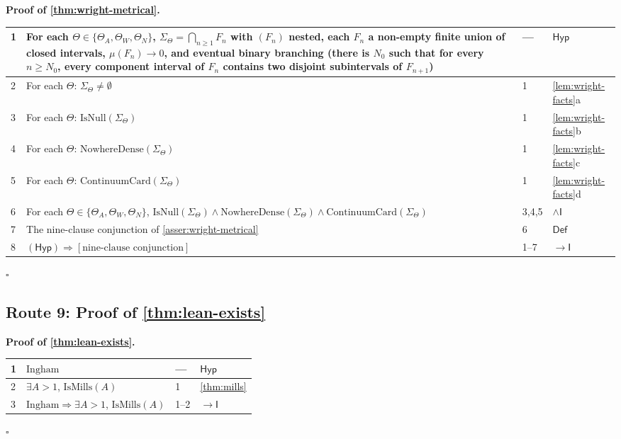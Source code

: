 \documentclass[11pt,reqno]{amsart}
\theoremstyle{blueplain}
\renewcommand{\qedsymbol}{\textcolor{proofqed}{\ensuremath{\square}}}
\renewenvironment{proof}[1][Proof]{\par\noindent\textbf{\textcolor{proofhead}{#1.}}\par\nobreak}{\par\nobreak\hfill\qedsymbol}
\newcounter{asser}
\numberwithin{equation}{section}
\begin{document}
\begin{proof}[\textbf{Proof of \cref{thm:wright-metrical}}]
	\label{proof:wright-metrical}
	{\scriptsize
		\begin{tabular}{|m{0.7cm}|m{12cm}|m{1.4cm}|m{2.5cm}|}
			\hline
			1 & For each \(\Theta\in\{\Theta_A,\Theta_W,\Theta_N\}\),
			\(\Sigma_\Theta=\bigcap_{n\ge1}F_n\) with \((F_n)\) nested,
			each \(F_n\) a non-empty finite union of closed intervals,
			\(\mu(F_n)\to0\), and eventual binary branching
			(there is \(N_0\) such that for every \(n\ge N_0\), every
			component interval of \(F_n\) contains two disjoint
			subintervals of \(F_{n+1}\))
			& --- & \(\mathsf{Hyp}\) \\ \hline
			2 & For each \(\Theta\): \(\Sigma_\Theta\ne\emptyset\)
			& 1 & \cref{lem:wright-facts}a \\ \hline
			3 & For each \(\Theta\): \(\mathrm{IsNull}(\Sigma_\Theta)\)
			& 1 & \cref{lem:wright-facts}b \\ \hline
			4 & For each \(\Theta\): \(\mathrm{NowhereDense}(\Sigma_\Theta)\)
			& 1 & \cref{lem:wright-facts}c \\ \hline
			5 & For each \(\Theta\): \(\mathrm{ContinuumCard}(\Sigma_\Theta)\)
			& 1 & \cref{lem:wright-facts}d \\ \hline
			6 & For each \(\Theta\in\{\Theta_A,\Theta_W,\Theta_N\}\),
			\(\mathrm{IsNull}(\Sigma_\Theta)\wedge
			\mathrm{NowhereDense}(\Sigma_\Theta)\wedge
			\mathrm{ContinuumCard}(\Sigma_\Theta)\)
			& 3,4,5 & \(\wedge\mathsf{I}\) \\ \hline
			7 & The nine-clause conjunction of \cref{asser:wright-metrical}
			& 6 & \(\mathsf{Def}\) \\ \hline
			8 & \((\mathsf{Hyp})\Rightarrow[\text{nine-clause conjunction}]\)
			& 1--7 & \(\rightarrow\mathsf{I}\) \\ \hline
		\end{tabular}
	}
\end{proof}
\subsection{Route 9: Proof of \cref{thm:lean-exists}}

\begin{proof}[\textbf{Proof of \cref{thm:lean-exists}}]
	\label{proof:lean-exists}
	{\scriptsize
		\begin{tabular}{|m{0.7cm}|m{12cm}|m{1.4cm}|m{2.5cm}|}
			\hline
			1 & $\text{Ingham}$ & --- & $\mathsf{Hyp}$ \\ \hline
			2 & $\exists A>1$, $\mathrm{IsMills}(A)$ & 1 & \cref{thm:mills} \\ \hline
			3 & $\text{Ingham}\Rightarrow\exists A>1$, $\mathrm{IsMills}(A)$ & 1--2 & $\rightarrow\mathsf{I}$ \\ \hline
		\end{tabular}
	}
\end{proof}
\end{document}
